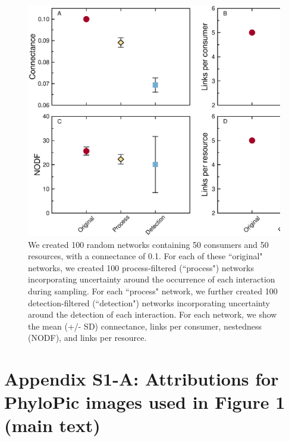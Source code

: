 \documentclass[12pt]{article}
\begin{document}
  \begin{figure}
  \label{sim_props}
  \caption{We created 100 random networks containing 50 consumers and 50 resources, with a connectance of 0.1. For each of these ``original" networks, we created 100 process-filtered (``process") networks incorporating uncertainty around the occurrence of each interaction during sampling. For each ``process" network, we further created 100 detection-filtered (``detection") networks incorporating uncertainty around the detection of each interaction. For each network, we show the mean (+/- SD) connectance, links per consumer, nestedness (NODF), and links per resource.}
  \begin{center}
  \includegraphics*[width=.9\textwidth]{figures/simulation_example.eps}
  \end{center}
  \end{figure}


\clearpage


\section*{Appendix S1-A: Attributions for PhyloPic images used in Figure 1 (main text)}
\end{document}

